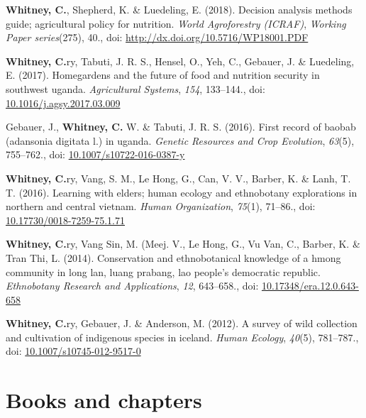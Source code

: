 \documentclass[11pt,a4paper,]{awesome-cv}
\newlength{\cslhangindent}
\newenvironment{CSLReferences}[2] %
 {\begin{list}{}{%
  \setlength{\itemindent}{0pt}
  \setlength{\leftmargin}{0pt}
  \setlength{\parsep}{0pt}
  \ifodd #1
   \setlength{\leftmargin}{\cslhangindent}
   \setlength{\itemindent}{-1\cslhangindent}
  \fi
  \setlength{\itemsep}{#2\baselineskip}}}
 {\end{list}}
\begin{document}
\begin{CSLReferences}{1}{0}
\textbf{Whitney, C.}, Shepherd, K. \& Luedeling, E. (2018). Decision
analysis methods guide; agricultural policy for nutrition. \emph{World
Agroforestry (ICRAF)}, \emph{Working Paper series}(275), 40., doi:
\url{http://dx.doi.org/10.5716/WP18001.PDF}

\textbf{Whitney, C.}ry, Tabuti, J. R. S., Hensel, O., Yeh, C., Gebauer,
J. \& Luedeling, E. (2017). Homegardens and the future of food and
nutrition security in southwest uganda. \emph{Agricultural Systems},
\emph{154}, 133--144., doi:
\href{https://doi.org/10.1016/j.agsy.2017.03.009}{10.1016/j.agsy.2017.03.009}

Gebauer, J., \textbf{Whitney, C.} W. \& Tabuti, J. R. S. (2016). First
record of baobab (adansonia digitata l.) in uganda. \emph{Genetic
Resources and Crop Evolution}, \emph{63}(5), 755--762., doi:
\href{https://doi.org/10.1007/s10722-016-0387-y}{10.1007/s10722-016-0387-y}

\textbf{Whitney, C.}ry, Vang, S. M., Le Hong, G., Can, V. V., Barber, K.
\& Lanh, T. T. (2016). Learning with elders; human ecology and
ethnobotany explorations in northern and central vietnam. \emph{Human
Organization}, \emph{75}(1), 71--86., doi:
\href{https://doi.org/10.17730/0018-7259-75.1.71}{10.17730/0018-7259-75.1.71}

\textbf{Whitney, C.}ry, Vang Sin, M. (Meej. V., Le Hong, G., Vu Van, C.,
Barber, K. \& Tran Thi, L. (2014). Conservation and ethnobotanical
knowledge of a hmong community in long lan, luang prabang, lao people's
democratic republic. \emph{Ethnobotany Research and Applications},
\emph{12}, 643--658., doi:
\href{https://doi.org/10.17348/era.12.0.643-658}{10.17348/era.12.0.643-658}

\textbf{Whitney, C.}ry, Gebauer, J. \& Anderson, M. (2012). A survey of
wild collection and cultivation of indigenous species in iceland.
\emph{Human Ecology}, \emph{40}(5), 781--787., doi:
\href{https://doi.org/10.1007/s10745-012-9517-0}{10.1007/s10745-012-9517-0}

\end{CSLReferences}

\section{Books and chapters}\label{books-and-chapters}
\end{document}
